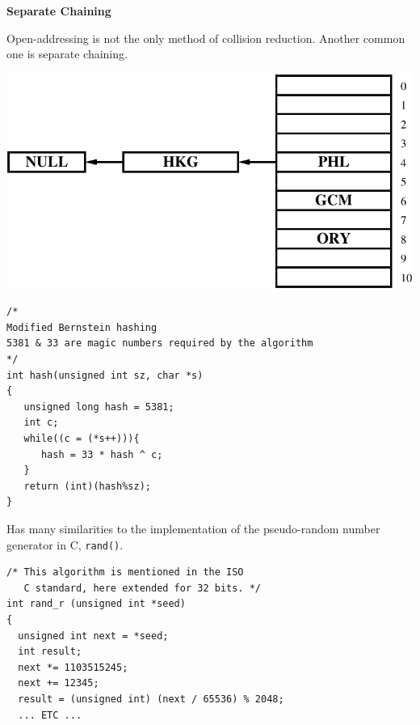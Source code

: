\newpage
{\samepage
\begin{center}
{\Large{\bf Separate Chaining}}
\end{center}
Open-addressing is not the only method of collision reduction. Another common
one is separate chaining.
\begin{center}
\includegraphics{../Images/hashsep.pdf}
\end{center}
}

\newpage
{\small
\begin{verbatim}
/*
Modified Bernstein hashing
5381 & 33 are magic numbers required by the algorithm
*/
int hash(unsigned int sz, char *s)
{
   unsigned long hash = 5381;
   int c;
   while((c = (*s++))){
      hash = 33 * hash ^ c;
   }
   return (int)(hash%sz);
}
\end{verbatim}

Has many similarities to the implementation of the pseudo-random number generator in C, \verb^rand()^.
{\small
\begin{verbatim}
/* This algorithm is mentioned in the ISO
   C standard, here extended for 32 bits. */
int rand_r (unsigned int *seed)
{
  unsigned int next = *seed;
  int result;
  next *= 1103515245;
  next += 12345;
  result = (unsigned int) (next / 65536) % 2048;
  ... ETC ...
\end{verbatim}
}
}

